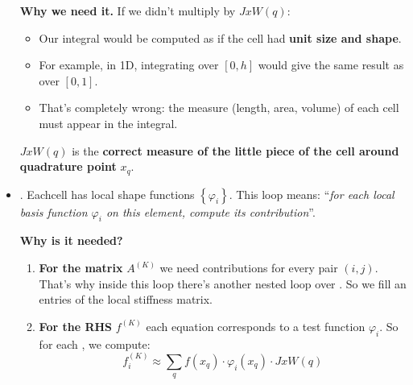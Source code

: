 \begin{itemize}
    \textcolor{Green3}{ \textbf{Why we need it.}} If we didn't multiply by $JxW(q)$:
    \begin{itemize}
        \item Our integral would be computed as if the cell had \textbf{unit size and shape}.
        \item For example, in 1D, integrating over $\left[0,h\right]$ would give the same result as over $\left[0,1\right]$.
        \item That's completely wrong: the measure (length, area, volume) of each cell must appear in the integral.
    \end{itemize}
    $JxW(q)$ is the \textbf{correct measure of the little piece of the cell around quadrature point} $x_{q}$.


    \item {}. Each\break cell has  local shape functions $\left\{\varphi_{i}\right\}$. This loop means: ``\emph{for each local basis function $\varphi_{i}$ on this element, compute its contribution}''.
    
    \textcolor{Green3}{ \textbf{Why is it needed?}}
    \begin{enumerate}
        \item \textbf{For the matrix} $A^{(K)}$ we need contributions for every pair $\left(i,j\right)$. That's why inside this loop there's another nested loop over . So we fill an entries of the local stiffness matrix.
        \item \textbf{For the RHS} $f^{(K)}$ each equation corresponds to a test function $\varphi_{i}$. So for each , we compute:
        \begin{equation*}
            f^{(K)}_{i} \approx \displaystyle\sum_q f\left(x_{q}\right) \cdot \varphi_{i}\left(x_{q}\right) \cdot JxW(q)
        \end{equation*}
    \end{enumerate}



\end{itemize}
